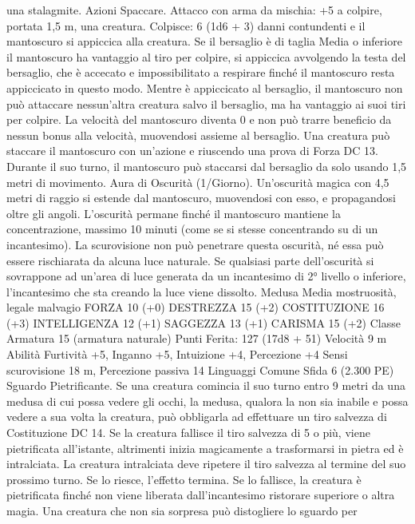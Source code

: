 \begin{multicols}{2}
una stalagmite.
Azioni
Spaccare. Attacco con arma da mischia: +5 a colpire, portata 1,5
m, una creatura.
Colpisce: 6 (1d6 + 3) danni contundenti e il mantoscuro si appiccica
alla creatura. Se il bersaglio è di taglia Media o inferiore il
mantoscuro ha vantaggio al tiro per colpire, si appiccica avvolgendo
la testa del bersaglio, che è accecato e impossibilitato a respirare
finché il mantoscuro resta appiccicato in questo modo.
Mentre è appiccicato al bersaglio, il mantoscuro non può attaccare
nessun’altra creatura salvo il bersaglio, ma ha vantaggio ai suoi tiri
per colpire. La velocità del mantoscuro diventa 0 e non può trarre
beneficio da nessun bonus alla velocità, muovendosi assieme al
bersaglio.
Una creatura può staccare il mantoscuro con un’azione e riuscendo
una prova di Forza DC 13. Durante il suo turno, il mantoscuro può
staccarsi dal bersaglio da solo usando 1,5 metri di movimento.
Aura di Oscurità (1/Giorno). Un’oscurità magica con 4,5 metri
di raggio si estende dal mantoscuro, muovendosi con esso, e
propagandosi oltre gli angoli. L’oscurità permane finché il
mantoscuro mantiene la concentrazione, massimo 10 minuti
(come se si stesse concentrando su di un incantesimo). La
scurovisione non può penetrare questa oscurità, né essa può
essere rischiarata da alcuna luce naturale. Se qualsiasi parte
dell’oscurità si sovrappone ad un’area di luce generata da un
incantesimo di 2° livello o inferiore, l’incantesimo che sta
creando la luce viene dissolto.
Medusa
Media mostruosità, legale malvagio
FORZA 10 (+0)
DESTREZZA 15 (+2)
COSTITUZIONE 16 (+3)
INTELLIGENZA 12 (+1)
SAGGEZZA 13 (+1)
CARISMA 15 (+2)
Classe Armatura 15 (armatura naturale)
\hspace*{0pt}\hfill{Punti Ferita}: 127 (17d8 + 51)
Velocità 9 m
Abilità Furtività +5, Inganno +5, Intuizione +4, Percezione +4
Sensi scurovisione 18 m, Percezione passiva 14
Linguaggi Comune
Sfida 6 (2.300 PE)
Sguardo Pietrificante. Se una creatura comincia il suo turno
entro 9 metri da una medusa di cui possa vedere gli occhi, la
medusa, qualora la non sia inabile e possa vedere a sua volta la
creatura, può obbligarla ad effettuare un tiro salvezza di
Costituzione DC 14. Se la creatura fallisce il tiro salvezza di 5 o
più, viene pietrificata all’istante, altrimenti inizia magicamente a
trasformarsi in pietra ed è intralciata. La creatura intralciata deve
ripetere il tiro salvezza al termine del suo prossimo turno. Se lo
riesce, l’effetto termina. Se lo fallisce, la creatura è pietrificata
finché non viene liberata dall’incantesimo ristorare superiore o
altra magia.
Una creatura che non sia sorpresa può distogliere lo sguardo per

\end{multicols}
